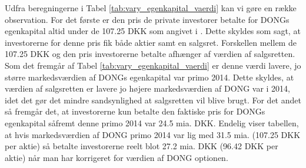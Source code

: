 \documentclass{article}
\begin{document}
Udfra beregningerne i Tabel \ref{tab:vary_egenkapital_vaerdi} kan vi gøre en række observation. For det første er den pris de private investorer betalte for DONGs egenkapital altid under de 107.25 DKK som angivet i \citep{FM2013a}. Dette skyldes som sagt, at investorerne for denne pris fik både aktier samt en salgsret. Forskellen mellem de 107.25 DKK og den pris investorerne betalte afhænger af værdien af salgsretten. Som det fremgår af Tabel \ref{tab:vary_egenkapital_vaerdi} er denne værdi lavere, jo større markedsværdien af DONGs egenkapital var primo 2014. Dette skyldes, at værdien af salgsretten er lavere jo højere markedsværdien af DONG var i 2014, idet det gør det mindre sandsynlighed at salgsretten vil blive brugt. For det andet så fremgår det, at investorerne kun betalte den faktiske pris for DONGs egenkapital såfremt denne primo 2014 var 24.5 mia. DKK. Endelig viser tabellen, at hvis markedsværdien af DONG primo 2014 var lig med 31.5 mia. (107.25 DKK per aktie) så betalte investorerne reelt blot 27.2 mia. DKK (96.42 DKK per aktie) når man har korrigeret for værdien af DONG optionen.
\end{document}
